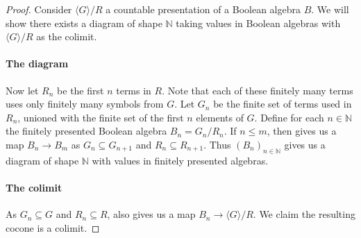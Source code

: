 \begin{proof}
  Consider $\langle G \rangle /R$ a countable presentation of a Boolean algebra $B$. 
  We will show there exists a diagram of shape $\mathbb N$ taking values in Boolean algebras 
  with $\langle G\rangle / R$ as the colimit.
  \paragraph{The diagram}
  Now let $R_n$ be the first $n$ terms in $R$. 
  Note that each of these finitely many terms uses only finitely many symbols from $G$.
  Let $G_n$ be the finite set of terms used in $R_n$, unioned with the finite set of the first $n$ elements of $G$. 
  Define for each $n\in\mathbb N$ the finitely presented Boolean algebra $B_n = G_n /R_n$. 
  If $n\leq m$, then  gives us a map $B_n \to B_m$ 
  as $G_n \subseteq G_{n+1}$ and $R_n \subseteq R_{n+1}$. 
  Thus $(B_n)_{n\in \mathbb N}$ gives us a diagram of shape $\mathbb N$
  with values in finitely presented algebras. 

  \paragraph{The colimit}
  As $G_n\subseteq G$ and $R_n \subseteq R$, 
   also gives us a map $B_n\to \langle G \rangle /R$. 
  We claim the resulting cocone is a colimit. 


\end{proof}
